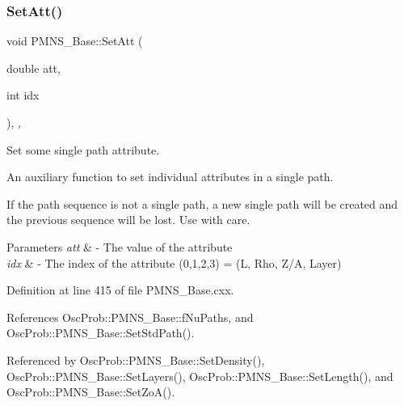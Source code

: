 \subsubsection{\texorpdfstring{Set\+Att()}{SetAtt()}\hspace{0.1cm}{\footnotesize\ttfamily [1/2]}}
{\footnotesize\ttfamily void P\+M\+N\+S\+\_\+\+Base\+::\+Set\+Att (\begin{DoxyParamCaption}\item[{double}]{att,  }\item[{int}]{idx }\end{DoxyParamCaption})\hspace{0.3cm}{\ttfamily [protected]}, {\ttfamily [virtual]}, {\ttfamily [inherited]}}

Set some single path attribute.

An auxiliary function to set individual attributes in a single path.

If the path sequence is not a single path, a new single path will be created and the previous sequence will be lost. Use with care.


\begin{DoxyParams}{Parameters}
{\em att} & -\/ The value of the attribute \\
\hline
{\em idx} & -\/ The index of the attribute (0,1,2,3) = (L, Rho, Z/A, Layer) \\
\hline
\end{DoxyParams}


Definition at line 415 of file P\+M\+N\+S\+\_\+\+Base.\+cxx.



References Osc\+Prob\+::\+P\+M\+N\+S\+\_\+\+Base\+::f\+Nu\+Paths, and Osc\+Prob\+::\+P\+M\+N\+S\+\_\+\+Base\+::\+Set\+Std\+Path().



Referenced by Osc\+Prob\+::\+P\+M\+N\+S\+\_\+\+Base\+::\+Set\+Density(), Osc\+Prob\+::\+P\+M\+N\+S\+\_\+\+Base\+::\+Set\+Layers(), Osc\+Prob\+::\+P\+M\+N\+S\+\_\+\+Base\+::\+Set\+Length(), and Osc\+Prob\+::\+P\+M\+N\+S\+\_\+\+Base\+::\+Set\+Zo\+A().


